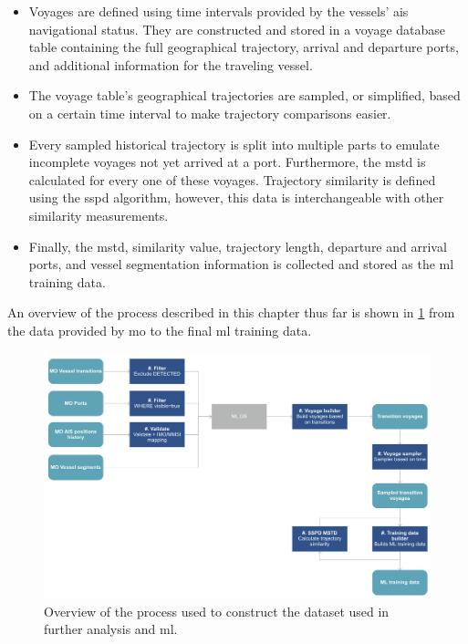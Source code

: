 \begin{itemize}
    \item Voyages are defined using time intervals provided by the vessels' \acrshort{ais} navigational status. They are constructed and stored in a voyage database table containing the full geographical trajectory, arrival and departure ports, and additional information for the traveling vessel.
    \item The voyage table's geographical trajectories are sampled, or simplified, based on a certain time interval to make trajectory comparisons easier.
    \item Every sampled historical trajectory is split into multiple parts to emulate incomplete voyages not yet arrived at a port. Furthermore, the \acrshort{mstd} is calculated for every one of these voyages. Trajectory similarity is defined using the \acrshort{sspd} algorithm, however, this data is interchangeable with other similarity measurements.
    \item Finally, the \acrshort{mstd}, similarity value, trajectory length, departure and arrival ports, and vessel segmentation information is collected and stored as the \acrshort{ml} training data.
\end{itemize}

An overview of the process described in this chapter thus far is shown in \cref{fig:dataset_overview} from the data provided by \acrfull{mo} to the final \acrshort{ml} training data.

\begin{figure}[htbp]  %
    \centering
    \includegraphics[width=1.0\textwidth]{figures/dataset_overview}
    \caption{Overview of the process used to construct the dataset used in further analysis and \acrshort{ml}.}
    \label{fig:dataset_overview}
\end{figure}

